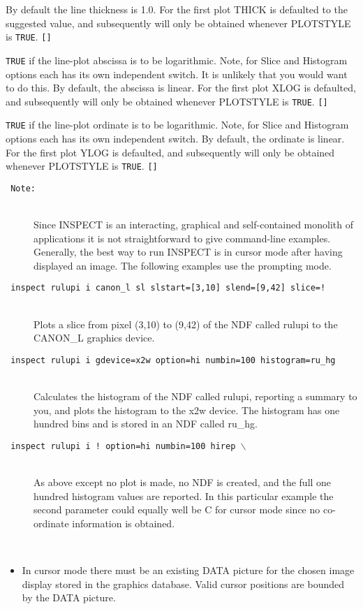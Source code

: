 \documentclass[twoside,11pt]{article}
\newcommand{\htmlref}[2]{#1}
\newcommand{\sstexamples}[1]{
   \goodbreak
   \item[Examples:] \mbox{} \\
   \vspace{-3.5ex}
   \begin{description}
      #1
   \end{description}
}
\newcommand{\sstsubsection}[1]{ \item[{#1}] \mbox{} \\}
\newcommand{\sstexamplesubsection}[2]{\sloppy \item{\ssttt #1} \mbox{} \\ #2 }
\newcommand{\sstnotes}[1]{\pagebreak[3] \item[Notes:] \mbox{} \\[1.3ex] #1}
\newenvironment{sstitemize}{%
  \vspace{-4.3ex}\begin{itemize}}{\end{itemize}}
\newcommand{\sstitemlist}[1]{
  \mbox{} \\
  \vspace{-3.5ex}
  \begin{sstitemize}
     #1
  \end{sstitemize}
}
\newcommand{\sstitem}{\item}
\newcommand{\ssttt}{\tt}
\renewcommand{\sstexamples}[1]{
      \htmlref{\item[Examples:]}{ap:example}
      \begin{description}
         #1
      \end{description}
   }
\renewcommand{\sstsubsection}[1]{\item[{#1}]}
\renewcommand{\sstexamplesubsection}[2]{\item[{\ssttt #1}] \\ #2}
\renewcommand{\sstnotes}[1]{\item[Notes:]
      \begin{description}
         #1
      \end{description}
   }
\newcommand{\sstitemlist}[1]{
      \begin{itemize}
         #1
      \end{itemize}
   }
\begin{document}
{{{         By default the line thickness is 1.0.  For the first plot
         THICK is defaulted to the suggested value, and subsequently
         will only be obtained whenever PLOTSTYLE is {\tt TRUE}.  {\tt []}
      }
      \sstsubsection{
         XLOG = \_LOGICAL (Read)
      }{
         {\tt TRUE} if the line-plot abscissa is to be logarithmic.  Note, for
         Slice and Histogram options each has its own independent
         switch.  It is unlikely that you would want to do this.  By
         default, the abscissa is linear.  For the first plot XLOG is
         defaulted, and subsequently will only be obtained whenever
         PLOTSTYLE is {\tt TRUE}. {\tt []}
      }
      \sstsubsection{
         YLOG = \_LOGICAL (Read)
      }{
         {\tt TRUE} if the line-plot ordinate is to be logarithmic. Note, for
         Slice and Histogram options each has its own independent
         switch.  By default, the ordinate is linear.  For the first
         plot YLOG is defaulted, and subsequently will only be
         obtained whenever PLOTSTYLE is {\tt TRUE}.  {\tt []}
      }
   }
   \sstexamples{
      \sstexamplesubsection{
         Note:
      }{
         Since INSPECT is an interacting, graphical and self-contained
         monolith of applications it is not straightforward to give
         command-line examples.  Generally, the best way to run INSPECT
         is in cursor mode after having displayed an image.  The
         following examples use the prompting mode.
      }
      \sstexamplesubsection{
         inspect rulupi i canon\_l sl slstart=[3,10] slend=[9,42] slice=!
      }{
         Plots a slice from pixel (3,10) to (9,42) of the NDF called
         rulupi to the CANON\_L graphics device.
      }
      \sstexamplesubsection{
         inspect rulupi i gdevice=x2w option=hi numbin=100 histogram=ru\_hg
      }{
         Calculates the histogram of the NDF called rulupi, reporting
         a summary to you, and plots the histogram to the x2w
         device.  The histogram has one hundred bins and is stored in
         an NDF called ru\_hg.
      }
      \sstexamplesubsection{
         inspect rulupi i ! option=hi numbin=100 hirep $\backslash$
      }{
         As above except no plot is made, no NDF is created, and
         the full one hundred histogram values are reported.  In this
         particular example the second parameter could equally well be
         C for cursor mode since no co-ordinate information is
         obtained.
      }
   }
   \sstnotes{
      \sstitemlist{

         \sstitem
         In cursor mode there must be an existing DATA picture for the
         chosen image display stored in the graphics database.  Valid
         cursor positions are bounded by the DATA picture.

}}}
\end{document}
